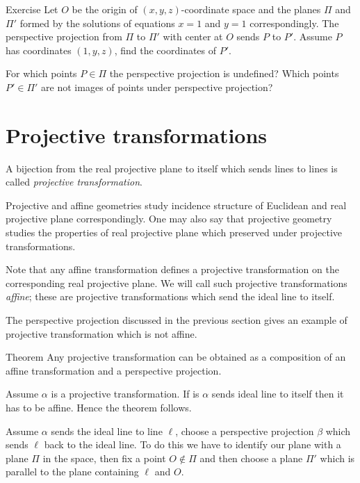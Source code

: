 \begin{thm}{Exercise}\label{ex:persect}
Let $O$ be the origin of $(x,y,z)$-coordinate space
and the planes $\Pi$ and $\Pi'$ formed by the solutions of equations
$x=1$ and $y=1$ correspondingly.
The perspective projection from $\Pi$ to $\Pi'$ with center at $O$ sends $P$ to $P'$.
Assume $P$ has coordinates $(1,y,z)$, find the coordinates of $P'$.

For which points $P\in \Pi$ the perspective projection is undefined?
Which points $P'\in\Pi'$ are not images of points under perspective projection?
\end{thm}

\section*{Projective transformations}

A bijection from the real projective plane to itself 
which sends lines to lines 
is called \emph{projective transformation}.

Projective and affine geometries study incidence structure of Euclidean and real projective plane correspondingly.
One may also say that
projective geometry studies the properties of real projective plane which preserved under projective transformations.


Note that any affine transformation defines  a projective transformation on the corresponding real projective plane.
We will call such projective transformations \emph{affine}; 
these are projective transformations which send the ideal line to itself.

The perspective projection discussed in the previous section 
gives an example of projective transformation which is not affine.

\begin{thm}{Theorem}
Any projective transformation can be obtained as a composition of an affine transformation and a perspective projection.
\end{thm}

Assume $\alpha$ is a projective transformation. 
If is $\alpha$ sends ideal line to itself then it has to be affine. 
Hence the theorem follows.

Assume $\alpha$ sends the ideal line to line $\ell$, choose a perspective projection $\beta$ which sends $\ell$ back to the ideal line.
To do this we have to identify our plane with a plane $\Pi$ in the space, 
then fix a point $O\notin \Pi$  
and then choose a plane $\Pi'$ which is
parallel to the plane containing $\ell$ and $O$.

